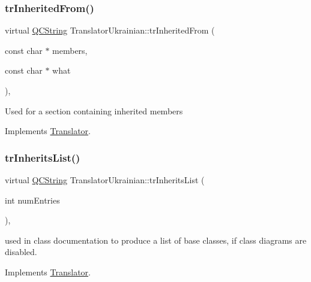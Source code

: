 \mbox{\label{class_translator_ukrainian_a740f2dd240558051c14ceddcf2671dbf}} 
\subsubsection{\texorpdfstring{trInheritedFrom()}{trInheritedFrom()}}
{\footnotesize\ttfamily virtual \mbox{\hyperlink{class_q_c_string}{Q\+C\+String}} Translator\+Ukrainian\+::tr\+Inherited\+From (\begin{DoxyParamCaption}\item[{const char $\ast$}]{members,  }\item[{const char $\ast$}]{what }\end{DoxyParamCaption})\hspace{0.3cm}{\ttfamily [inline]}, {\ttfamily [virtual]}}

Used for a section containing inherited members 

Implements \mbox{\hyperlink{class_translator}{Translator}}.

\mbox{\label{class_translator_ukrainian_a9f2197050d30227bbcef86e81dec76cd}} 
\subsubsection{\texorpdfstring{trInheritsList()}{trInheritsList()}}
{\footnotesize\ttfamily virtual \mbox{\hyperlink{class_q_c_string}{Q\+C\+String}} Translator\+Ukrainian\+::tr\+Inherits\+List (\begin{DoxyParamCaption}\item[{int}]{num\+Entries }\end{DoxyParamCaption})\hspace{0.3cm}{\ttfamily [inline]}, {\ttfamily [virtual]}}

used in class documentation to produce a list of base classes, if class diagrams are disabled. 

Implements \mbox{\hyperlink{class_translator}{Translator}}.

\mbox{\label{class_translator_ukrainian_afd3e0921708a2b09962436e81ba9c68f}} 
